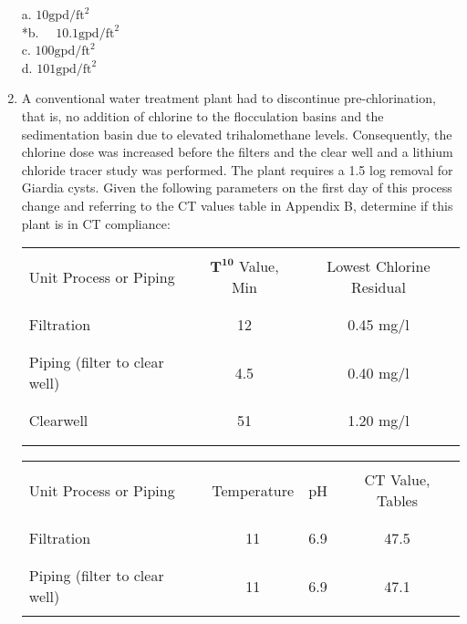 \begin{enumerate}
a. $10 \mathrm{gpd} / \mathrm{ft}^{2}$\\
*b. $\quad 10.1 \mathrm{gpd} / \mathrm{ft}^{2}$\\
c. $100 \mathrm{gpd} / \mathrm{ft}^{2}$\\
d. $101 \mathrm{gpd} / \mathrm{ft}^{2}$ \\
\item A conventional water treatment plant had to discontinue pre-chlorination, that is, no addition of chlorine to the flocculation basins and the sedimentation basin due to elevated trihalomethane levels. Consequently, the chlorine dose was increased before the filters and the clear well and a lithium chloride tracer study was performed. The plant requires a 1.5 log removal for Giardia cysts. Given the following parameters on the first day of this process change and referring to the CT values table in Appendix B, determine if this plant is in CT compliance:\\
\begin{center}
\begin{tabular}{|l|c|c|}
\hline\\
Unit Process or Piping & $\mathbf{T}^{\mathbf{1 0}}$ Value, Min & Lowest Chlorine Residual \\\\
\hline\\
Filtration & 12 & 0.45 mg/l \\\\
\hline\\
Piping (filter to clear well) & 4.5 & 0.40 mg/l \\\\
\hline\\
Clearwell & 51 & 1.20 mg/l \\\\
\hline\\
\end{tabular}
\end{center}
\begin{center}
\begin{tabular}{|l|c|c|c|}
\hline\\
Unit Process or Piping & Temperature & pH & CT Value, Tables \\\\
\hline\\
Filtration & 11 & 6.9 & 47.5 \\\\
\hline\\
Piping (filter to clear well) & 11 & 6.9 & 47.1 \\\\

\end{tabular}
\end{center}
\end{enumerate}
